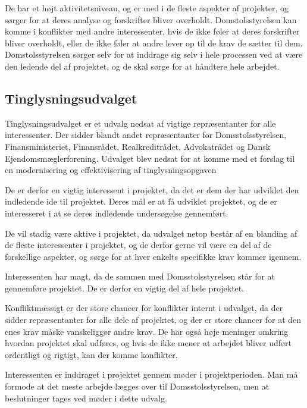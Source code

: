 \documentclass[10pt,a4paper,danish]{article}
\begin{document}
De har et højt aktivitetsniveau, og er med i de fleste aspekter af projekter, og sørger for at deres analyse og forskrifter bliver overholdt. Domstolsstyrelsen kan komme i konflikter med andre interessenter, hvis de ikke føler at deres forskrifter bliver overholdt, eller de ikke føler at andre lever op til de krav de sætter til dem. Domstolsstyrelsen sørger selv for at inddrage sig selv i hele processen ved at være den ledende del af projektet, og de skal sørge for at håndtere hele arbejdet.


\subsection{Tinglysningsudvalget}

Tinglysningsudvalget er et udvalg nedsat af vigtige repræsentanter for alle interessenter. Der sidder blandt andet repræsentanter for Domsstolsstyrelsen, Finansministeriet, Finansrådet, Realkreditrådet, Advokatrådet og Dansk Ejendomsmæglerforening. Udvalget blev nedsat for at komme med et forslag til en modernisering og effektivisering af tinglysningsopgaven

De er derfor en vigtig interessent i projektet, da det er dem der har udviklet den indledende ide til projektet. Deres mål er at få udviklet projektet, og de er interesseret i at se deres indledende undersøgelse gennemført.

De vil stadig være aktive i projektet, da udvalget netop består af en blanding af de fleste interessenter i projektet, og de derfor gerne vil være en del af de forskellige aspekter, og sørge for at hver enkelts specifikke krav kommer igennem.

Interessenten har magt, da de sammen med Domsstolsstyrelsen står for at gennemføre projektet. De er derfor en vigtig del af hele projektet.

Konfliktmæssigt er der store chancer for konflikter internt i udvalget, da der sidder repræsentanter for alle dele af projektet, og der er store chancer for at den enes krav måske vanskeliggør andre krav. De har også høje meninger omkring hvordan projektet skal udføres, og hvis de ikke mener at arbejdet bliver udført ordentligt og rigtigt, kan der komme konflikter.

Interessenten er inddraget i projektet gennem møder i projektperioden. Man må formode at det meste arbejde lægges over til Domsstolsstyrelsen, men at beslutninger tages ved møder i dette udvalg.
\end{document}
